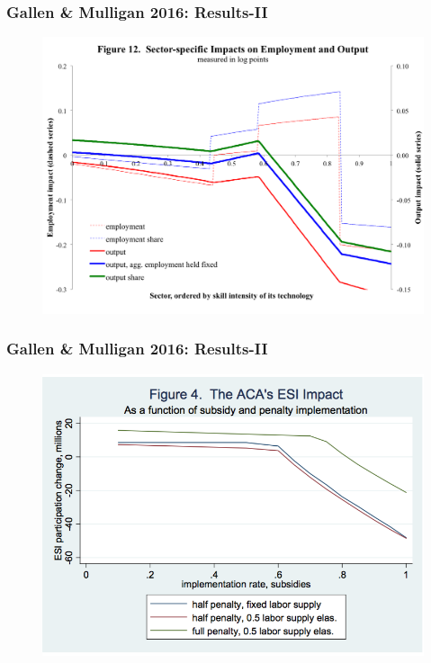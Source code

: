 \documentclass{beamer}
\begin{document}
\begin{frame}
\frametitle[alignment=center]{Gallen \& Mulligan 2016: Results-II}
\begin{figure}
\centering
\includegraphics[scale=0.42]{Figures/OutputEffects.png}
\end{figure}
\end{frame}

\begin{frame}
\frametitle[alignment=center]{Gallen \& Mulligan 2016: Results-II}
\begin{figure}
\centering
\includegraphics[scale=0.37]{Figures/ACAESIImpact.png}
\end{figure}
\end{frame}
\end{document}
